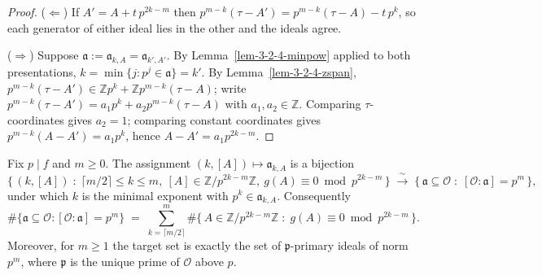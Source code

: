 \begin{proof}
  ($\Leftarrow$) If $A' = A + t\,p^{2k-m}$ then
  $p^{m-k}(\tau - A') = p^{m-k}(\tau - A) - t\,p^k$, so each generator of either
  ideal lies in the other and the ideals agree.

  ($\Rightarrow$) Suppose $\mathfrak{a} := \mathfrak{a}_{k,A} = \mathfrak{a}_{k',A'}$.
  By Lemma~\ref{lem-3-2-4-minpow} applied to both presentations,
  $k = \min\{j : p^j \in \mathfrak{a}\} = k'$. By Lemma~\ref{lem-3-2-4-zspan},
  $p^{m-k}(\tau - A') \in \mathbb{Z}p^k + \mathbb{Z}p^{m-k}(\tau - A)$; write
  $p^{m-k}(\tau - A') = a_1 p^k + a_2 p^{m-k}(\tau - A)$ with
  $a_1, a_2 \in \mathbb{Z}$. Comparing $\tau$-coordinates gives $a_2 = 1$;
  comparing constant coordinates gives $p^{m-k}(A - A') = a_1 p^k$, hence
  $A - A' = a_1 p^{2k-m}$.
\end{proof}

\begin{theorem}
  \label{lem-3-2-4}
  Fix $p \mid f$ and $m \ge 0$. The assignment $(k, [A]) \mapsto \mathfrak{a}_{k,A}$
  is a bijection
  \[
    \bigl\{\, (k, [A]) \;:\; \lceil m/2\rceil \le k \le m,\
      [A] \in \mathbb{Z}/p^{2k-m}\mathbb{Z},\ g(A) \equiv 0 \bmod p^{2k-m} \,\bigr\}
    \;\xrightarrow{\ \sim\ }\;
    \bigl\{\, \mathfrak{a} \subseteq \mathcal{O} \;:\;
      [\mathcal{O} : \mathfrak{a}] = p^m \,\bigr\},
  \]
  under which $k$ is the minimal exponent with
  $p^k \in \mathfrak{a}_{k,A}$. Consequently
  \[
    \#\bigl\{\mathfrak{a} \subseteq \mathcal{O} :
        [\mathcal{O} : \mathfrak{a}] = p^m\bigr\}
    \;=\;
    \sum_{k = \lceil m/2\rceil}^{m}
      \#\bigl\{\, A \in \mathbb{Z}/p^{2k-m}\mathbb{Z} \;:\;
        g(A) \equiv 0 \bmod p^{2k-m} \,\bigr\}.
  \]
  Moreover, for $m \ge 1$ the target set is exactly the set of
  $\mathfrak{p}$-primary ideals of norm $p^m$, where $\mathfrak{p}$ is the unique
  prime of $\mathcal{O}$ above $p$.
\end{theorem}

